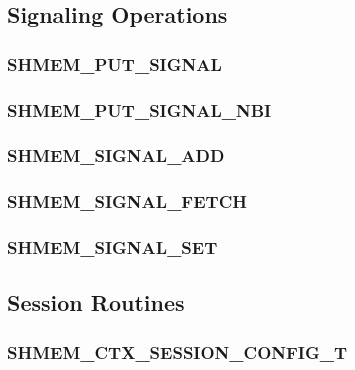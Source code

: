 \documentclass[10pt,oneside]{book}
\begin{document}
\label{subsec:shmem_atomic_fetch_or_nbi}


\label{subsec:shmem_atomic_fetch_xor_nbi}




\subsection{Signaling Operations}\label{sec:shmem_signal}


\subsubsection{\textbf{SHMEM\_PUT\_SIGNAL}}\label{subsec:shmem_put_signal}


\subsubsection{\textbf{SHMEM\_PUT\_SIGNAL\_NBI}}\label{subsec:shmem_put_signal_nbi}


\subsubsection{\textbf{SHMEM\_SIGNAL\_ADD}}\label{subsec:shmem_signal_add}


\subsubsection{\textbf{SHMEM\_SIGNAL\_FETCH}}\label{subsec:shmem_signal_fetch}


\subsubsection{\textbf{SHMEM\_SIGNAL\_SET}}\label{subsec:shmem_signal_set}



\subsection{Session Routines}\label{subsec:sessions}


\subsubsection{\textbf{SHMEM\_CTX\_SESSION\_CONFIG\_T}}\label{subsec:shmem_ctx_session_config_t}

\end{document}
